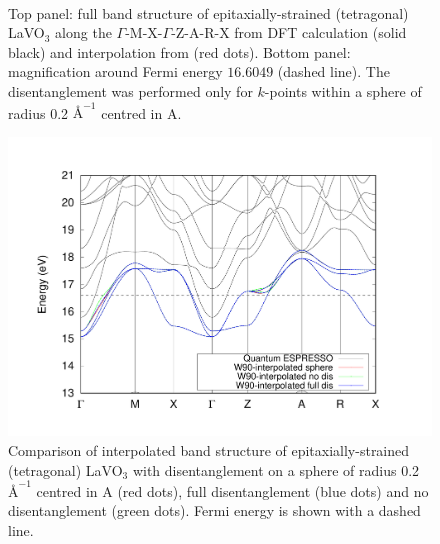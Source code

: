 \begin{figure}[t!]
\centering
{}\\
\caption{Top panel: full band structure of epitaxially-strained (tetragonal) LaVO$_3$ along the $\Gamma$-M-X-$\Gamma$-Z-A-R-X from DFT calculation (solid black) and interpolation from \Wannier{} (red dots). Bottom panel: magnification around Fermi energy $16.6049$ (dashed line). The disentanglement was performed only for $k$-points within a sphere of radius 0.2 $\si{\angstrom}^{-1}$ centred in A.}
\label{fig20.1}
\end{figure}

\begin{figure}[h!]
\centering
\includegraphics[width=0.7\columnwidth]{figure/example20/LaVO3_bandstructure_all.pdf}
\caption{Comparison of interpolated band structure of epitaxially-strained (tetragonal) LaVO$_3$ with disentanglement on a sphere of radius 0.2 $\si{\angstrom}^{-1}$ centred in A (red dots), full disentanglement (blue dots) and no disentanglement (green dots). Fermi energy is shown with a dashed line.}\label{fig20.2}
\end{figure}

